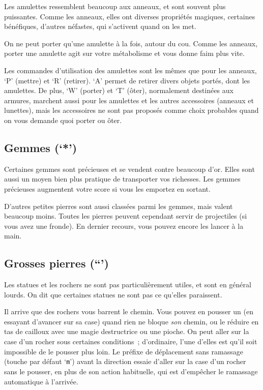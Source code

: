\documentclass[titlepage]{article}
\begin{document}
Les amulettes ressemblent beaucoup aux anneaux, et sont souvent plus
puissantes.
Comme les anneaux, elles ont diverses propriétés magiques, certaines
bénéfiques, d'autres néfastes, qui s'activent quand on les met.


On ne peut porter qu'une amulette à la fois, autour du cou.
Comme les anneaux, porter une amulette agit sur votre métabolisme et vous
donne faim plus vite.


Les commandes d'utilisation des amulettes sont les mêmes que pour les
anneaux, `P' (mettre) et `R' (retirer).
`A' permet de retirer divers objets portés, dont les amulettes.
De plus, `W' (porter) et `T' (ôter), normalement destinées aux
armures, marchent aussi pour les amulettes et les autres accessoires
(anneaux et lunettes), mais les accessoires ne sont pas proposés comme
choix probables quand on vous demande quoi porter ou ôter.

\subsection{Gemmes (`*')}



Certaines gemmes sont précieuses et se vendent contre beaucoup d'or.
Elles sont aussi un moyen bien plus pratique de transporter vos
richesses.
Les gemmes précieuses augmentent votre score si vous les emportez en
sortant.


D'autres petites pierres sont aussi classées parmi les gemmes, mais
valent beaucoup moins.
Toutes les pierres peuvent cependant servir de projectiles (si vous avez
une fronde).
En dernier recours, vous pouvez encore les lancer à la main.

\subsection{Grosses pierres (``')}



Les statues et les rochers ne sont pas particulièrement utiles, et sont en
général lourds.
On dit que certaines statues ne sont pas ce qu'elles paraissent.


Il arrive que des rochers vous barrent le chemin.
Vous pouvez en pousser un (en essayant d'avancer sur sa case) quand rien
ne bloque \textit{son} chemin, ou le réduire en tas de cailloux avec une
magie destructrice ou une pioche.
On peut aller sur la case d'un rocher sous certaines conditions~;
d'ordinaire, l'une d'elles est qu'il soit impossible de le pousser plus
loin.
Le préfixe de déplacement sans ramassage (touche par défaut
`\texttt{m}') avant la direction essaie d'aller sur la case d'un rocher
sans le pousser, en plus de son action habituelle, qui est d'empêcher le
ramassage automatique à l'arrivée.
\end{document}
